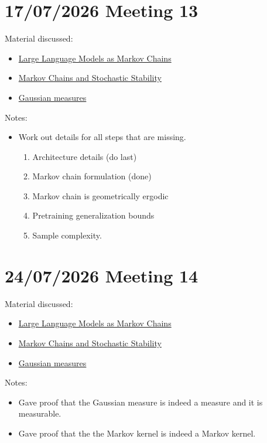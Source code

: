 \documentclass{article}
\begin{document}
\section{17/07/2026 Meeting 13}
Material discussed:
\begin{itemize}
    \item \href{https://arxiv.org/abs/2410.02724}{Large Language Models as Markov Chains}
    \item \href{https://www.cambridge.org/core/books/markov-chains-and-stochastic-stability/E2B82BFB409CD2F7D67AFC5390C565EC}{Markov Chains and Stochastic Stability}
    \item \href{https://www.ams.org/surv/062}{Gaussian measures}
\end{itemize}
Notes:
\begin{itemize}
    \item Work out details for all steps that are missing.
    \begin{enumerate}
        \item Architecture details (do last)
        \item Markov chain formulation (done)
        \item Markov chain is geometrically ergodic
        \item Pretraining generalization bounds
        \item Sample complexity.
    \end{enumerate}
\end{itemize}


\section{24/07/2026 Meeting 14}
Material discussed:
\begin{itemize}
    \item \href{https://arxiv.org/abs/2410.02724}{Large Language Models as Markov Chains}
    \item \href{https://www.cambridge.org/core/books/markov-chains-and-stochastic-stability/E2B82BFB409CD2F7D67AFC5390C565EC}{Markov Chains and Stochastic Stability}
    \item \href{https://www.ams.org/surv/062}{Gaussian measures}
\end{itemize}
Notes:
\begin{itemize}
    \item Gave proof that the Gaussian measure is indeed a measure and it is measurable.
    \item Gave proof that the the Markov kernel is indeed a Markov kernel.
\end{itemize}
\end{document}

